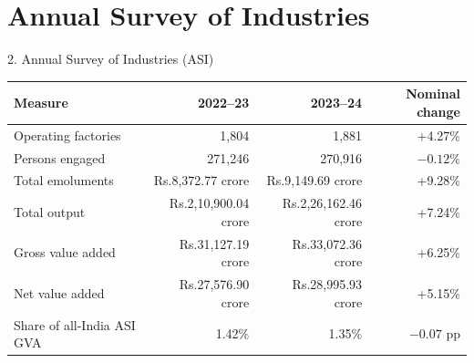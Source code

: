 \documentclass[aspectratio=169,11pt]{beamer}
\renewcommand{\arraystretch}{1.12}
\newcommand{\smalltable}{\scriptsize\setlength{\tabcolsep}{2.5pt}\renewcommand{\arraystretch}{1.08}}
\begin{document}
\section{Annual Survey of Industries}
\begin{frame}{2. Annual Survey of Industries (ASI)}\smalltable
\begin{tabularx}{\textwidth}{p{}rrr}\toprule
Measure & 2022--23 & 2023--24 & Nominal change\\\midrule
Operating factories & 1,804 & 1,881 & +4.27\%\\
Persons engaged & 271,246 & 270,916 & $-0.12\%$\\
Total emoluments & Rs.8,372.77 crore & Rs.9,149.69 crore & +9.28\%\\
Total output & Rs.2,10,900.04 crore & Rs.2,26,162.46 crore & +7.24\%\\
Gross value added & Rs.31,127.19 crore & Rs.33,072.36 crore & +6.25\%\\
Net value added & Rs.27,576.90 crore & Rs.28,995.93 crore & +5.15\%\\
Share of all-India ASI GVA & 1.42\% & 1.35\% & $-0.07$ pp\\
\bottomrule\end{tabularx}
\end{frame}
\end{document}
